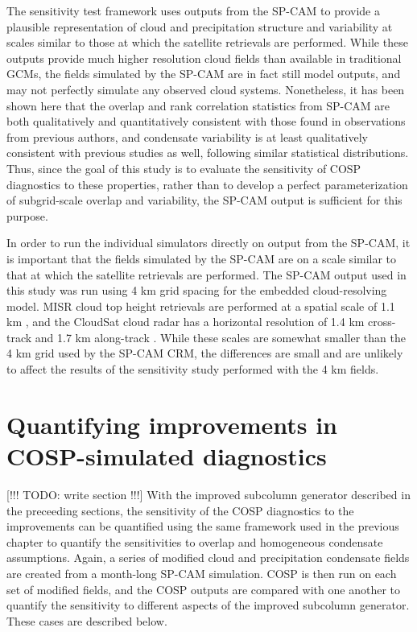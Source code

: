 The sensitivity test framework uses outputs from the SP-CAM to provide a plausible representation of cloud and precipitation structure and variability at scales similar to those at which the satellite retrievals are performed. While these outputs provide much higher resolution cloud fields than available in traditional GCMs, the fields simulated by the SP-CAM are in fact still model outputs, and may not perfectly simulate any observed cloud systems. Nonetheless, it has been shown here that the overlap and rank correlation statistics from SP-CAM are both qualitatively and quantitatively consistent with those found in observations from previous authors, and condensate variability is at least qualitatively consistent with previous studies as well, following similar statistical distributions. Thus, since the goal of this study is to evaluate the sensitivity of COSP diagnostics to these properties, rather than to develop a perfect parameterization of subgrid-scale overlap and variability, the SP-CAM output is sufficient for this purpose. %

In order to run the individual simulators directly on output from the SP-CAM, it is important that the fields simulated by the SP-CAM are on a scale similar to that at which the satellite retrievals are performed. The SP-CAM output used in this study was run using 4 km grid spacing for the embedded cloud-resolving model. MISR cloud top height retrievals are performed at a spatial scale of 1.1 km \citep{moroney_et_al_2002}, and the CloudSat cloud radar has a horizontal resolution of 1.4 km cross-track and 1.7 km along-track \citep{tanelli_et_al_2008}. While these scales are somewhat smaller than the 4 km grid used by the SP-CAM CRM, the differences are small and are unlikely to affect the results of the sensitivity study performed with the 4 km fields.

\section{Quantifying improvements in COSP-simulated diagnostics}
\label{subgrid2_results_section}
[!!! TODO: write section !!!]
With the improved subcolumn generator described in the preceeding sections, the sensitivity of the COSP diagnostics to the improvements can be quantified using the same framework used in the previous chapter to quantify the sensitivities to overlap and homogeneous condensate assumptions. Again, a series of modified cloud and precipitation condensate fields are created from a month-long SP-CAM simulation. COSP is then run on each set of modified fields, and the COSP outputs are compared with one another to quantify the sensitivity to different aspects of the improved subcolumn generator. These cases are described below.

